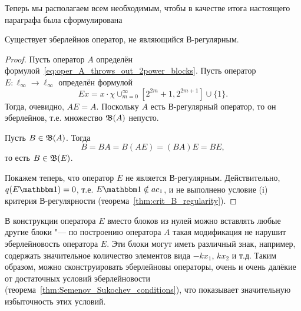 
Теперь мы располагаем всем необходимым,
чтобы в качестве итога настоящего параграфа была сформулирована

\begin{theorem}
	\label{thm:Eberlein_but_not_B-regular_exists}
	Существует эберлейнов оператор, не являющийся В-регулярным.
\end{theorem}

\begin{proof}
	Пусть оператор $A$ определён формулой~\eqref{eq:oper_A_throws_out_2power_blocks}.
	Пусть оператор $E:\ell_\infty\to\ell_\infty$ определён формулой
	\begin{equation}
		Ex = x \cdot \chi{\cup_{m=0}^{\infty}\left[2^{2 m}+1, 2^{2 m+1}\right] \cup\{1\}}
		.
	\end{equation}
	Тогда, очевидно, $AE=A$.
	Поскольку $A$ есть В-регулярный оператор, то он эберлейнов,
	т.е. множество $\mathfrak{B}(A)$ непусто.

	Пусть $B\in\mathfrak{B}(A)$. Тогда
	\begin{equation}
		B = BA = B(AE) = (BA)E = BE
		,
	\end{equation}
	то есть $B\in\mathfrak{B}(E)$.

	Покажем теперь, что оператор $E$ не является В-регулярным.
	Действительно, $q(E\one) =0$, т.е. $ E\one \notin ac_1$,
	и не выполнено условие (i) критерия В-регулярности (теорема~\ref{thm:crit_B_regularity}).
\end{proof}


	В конструкции оператора $E$ вместо блоков из нулей можно вставлять любые другие блоки "---
	по построению оператора $A$ такая модификация не нарушит эберлейновость оператора $E$.
	Эти блоки могут иметь различный знак, например, содержать значительное количество
	элементов вида $-kx_1$, $kx_2$ и т.д.
	Таким образом, можно сконструировать эберлейновы операторы, очень и очень далёкие
	от достаточных условий эберлейновости (теорема~\ref{thm:Semenov_Sukochev_conditions}),
	что показывает значительную избыточность этих условий.

